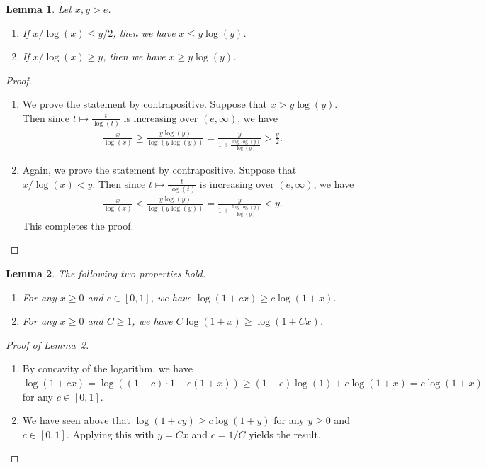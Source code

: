 \documentclass{article}
\newtheorem{lemma}{Lemma}
\theoremstyle{remark}
\begin{document}
\begin{lemma}\label{lem_logs}
    Let $x,y > e$.
    \begin{enumerate}
        \item[(i)] If $x/\log(x) \leq y/2$, then we have $x \leq y \log(y)$.
        \item[(ii)] If $x/\log(x) \geq y$, then we have $x \geq y \log(y)$.
    \end{enumerate}
\end{lemma}
\begin{proof}
\begin{enumerate}
    \item[(i)] We prove the statement by contrapositive. Suppose that $x > y \log (y)$. Then since $t \mapsto \frac{t}{\log(t)}$ is increasing over $(e, \infty)$, we have
    \begin{align*}
        \frac{x}{\log(x)} \geq \frac{y \log(y)}{\log(y \log (y))} = \frac{y}{ 1 +\frac{\log \log(y)}{\log(y)}} > \frac{y}{2}.
    \end{align*}
    \item[(ii)] Again, we prove the statement by contrapositive. 
    Suppose that $x /\log(x) < y.$ Then since $t \mapsto \frac{t}{\log(t)}$ is increasing over $(e, \infty)$, we have
     \begin{align*}
        \frac{x}{\log(x)} < \frac{y \log(y)}{\log(y \log (y))} = \frac{y}{ 1 +\frac{\log \log(y)}{\log(y)}} < y.
    \end{align*}
    This completes the proof.
\end{enumerate}

    
\end{proof}

\begin{lemma}\label{lem_logs_constants}
    The following two properties hold.
    \begin{enumerate}
        \item[(i)] For any $x \geq 0$ and $c \in [0,1]$, we have $\log(1+cx) \geq c\log(1+x)$.
        \item[(ii)] For any $x \geq 0$ and $C\geq 1$, we have $C\log(1+x) \geq \log(1+Cx)$.
    \end{enumerate}
\end{lemma}

\begin{proof}[Proof of Lemma~\ref{lem_logs_constants}]
\begin{enumerate}
    \item[(i)] By concavity of the logarithm, we have $\log(1+cx) = \log\left((1-c)\cdot 1 + c(1+x)\right) \geq (1-c) \log(1) + c\log(1+x) = c \log(1+x)$ for any $c \in [0,1]$. 
    \item[(ii)] We have seen above that $\log(1+cy) \geq c \log(1+y)$ for any $y \geq 0$ and $c \in [0,1]$. 
Applying this with $y = Cx$ and $c = 1/C$ yields the result. 
\end{enumerate}
    
\end{proof}
\end{document}
